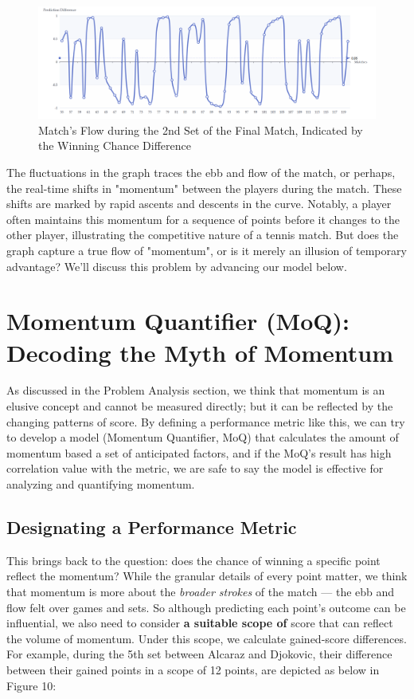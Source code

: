 \documentclass[12pt]{article}  %
\begin{document}
\begin{figure}[htbp]  %
	\centering  %
	\includegraphics[width=.8\textwidth]{prediction-difference.png} %
	\caption{Match's Flow during the 2nd Set of the Final Match, Indicated by the Winning Chance Difference} %
\end{figure}

The fluctuations in the graph traces the ebb and flow of the match, or perhaps, the real-time shifts in "momentum" between the players during the match. These shifts are marked by rapid ascents and descents in the curve. Notably, a player often maintains this momentum for a sequence of points before it changes to the other player, illustrating the competitive nature of a tennis match. But does the graph capture a true flow of "momentum", or is it merely an illusion of temporary advantage? We'll discuss this problem by advancing our model below.

\section{Momentum Quantifier (MoQ): Decoding the Myth of Momentum}

As discussed in the Problem Analysis section, we think that momentum is an elusive concept and cannot be measured directly; but it can be reflected by the changing patterns of score. By defining a performance metric like this, we can try to develop a model (Momentum Quantifier, MoQ) that calculates the amount of momentum based a set of anticipated factors, and if the MoQ's result has high correlation value with the metric, we are safe to say the model is effective for analyzing and quantifying momentum. 

\subsection{Designating a Performance Metric}
This brings back to the question: does the chance of winning a specific point reflect the momentum? While the granular details of every point matter, we think that momentum is more about the \textit{broader strokes} of the match — the ebb and flow felt over games and sets. So although predicting each point's outcome can be influential, we also need to consider \textbf{a suitable scope of} score that can reflect the volume of momentum. Under this scope, we calculate gained-score differences. For example, during the 5th set between Alcaraz and Djokovic, their difference between their gained points in a scope of 12 points, are depicted as below in Figure 10: 
\end{document}
